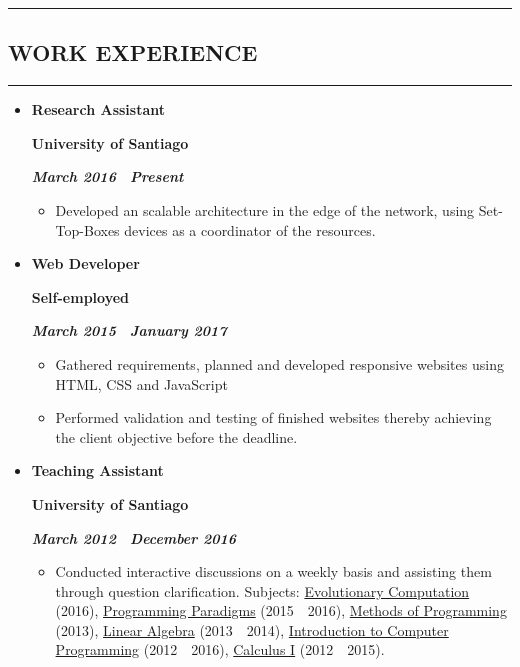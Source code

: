 \documentclass[10pt,letterpaper]{article}
\newcommand{\textbox}[1]{
  \parbox{.333\textwidth}{#1}
}
\newcommand{\sectionTitle}[1]{
  \hrule
  \vspace{-1.0em} 
  \subsection*{\uppercase{\textbf{#1}}}
  \vspace{-0.3em}
    \hrule
    \vspace{0.3em}  
}
\newcommand{\titleExperienceWithoutLocation}[4]{
  \vspace{1.0em}
  \item[]
  {
    \textbox{\textbf{#1}\hfill}\textbox{\hfil \textbf{#2}\hfil}\hfill \textbf{\emph{#3 \textendash \ #4}}
  }
}
\begin{document}
  \vspace{0.30em} 
  
  \sectionTitle{Work Experience}
  \vspace{-1.1em}
  \begin{itemize}[noitemsep,topsep=0pt]
    \titleExperienceWithoutLocation{Research Assistant}{University of Santiago}{March 2016}{Present}
      \begin{itemize}[label=\textbullet,noitemsep,topsep=0pt]
        \item Developed an scalable architecture in the edge of the network, using Set-Top-Boxes devices as a coordinator of the resources.
      \end{itemize}

    \vspace{-0.6em} 
    \titleExperienceWithoutLocation{Web Developer}{Self-employed}{March 2015}{January 2017}
      \begin{itemize}[label=\textbullet,noitemsep,topsep=0pt]
        \item Gathered requirements, planned and developed responsive websites using HTML, CSS and JavaScript 
        \item Performed validation and testing of finished websites thereby achieving the client objective before the deadline.
      \end{itemize}
    
    \vspace{-0.6em} 
    \titleExperienceWithoutLocation{Teaching Assistant}{University of Santiago}{March 2012}{December 2016}
      \begin{itemize}[label=\textbullet]
        \itemsep0em
        \item Conducted interactive discussions on a weekly basis and assisting them through question clarification. Subjects: \ul{Evolutionary Computation} (2016), \ul{Programming Paradigms} (2015\ \textendash \ 2016), \ul{Methods of Programming} (2013), \ul{Linear Algebra} (2013\ \textendash \ 2014), \ul{Introduction to Computer Programming} (2012\ \textendash \ 2016), \ul{Calculus I} (2012\ \textendash \ 2015).
      \end{itemize}
  \end{itemize}
  \vspace{0.30em} 
  
\end{document}
